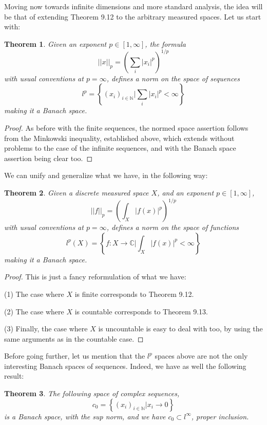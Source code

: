 \documentclass[12pt]{amsbook}
\newtheorem{theorem}{Theorem}[chapter]
\begin{document}
Moving now towards infinite dimensions and more standard analysis, the idea will be that of extending Theorem 9.12 to the arbitrary measured spaces. Let us start with:


\begin{theorem}
Given an exponent $p\in[1,\infty]$, the formula
$$||x||_p=\left(\sum_i|x_i|^p\right)^{1/p}$$
with usual conventions at $p=\infty$, defines a norm on the space of sequences
$$l^p=\left\{(x_i)_{i\in\mathbb N}\Big|\sum_i|x_i|^p<\infty\right\}$$
making it a Banach space.
\end{theorem}

\begin{proof}
As before with the finite sequences, the normed space assertion follows from the Minkowski inequality, established above, which extends without problems to the case of the infinite sequences, and with the Banach space assertion being clear too.
\end{proof}

We can unify and generalize what we have, in the following way:

\begin{theorem}
Given a discrete measured space $X$, and an exponent $p\in[1,\infty]$,
$$||f||_p=\left(\int_X|f(x)|^p\right)^{1/p}$$
with usual conventions at $p=\infty$, defines a norm on the space of functions 
$$l^p(X)=\left\{f:X\to\mathbb C\Big|\int_X|f(x)|^p<\infty\right\}$$
making it a Banach space.
\end{theorem}

\begin{proof}
This is just a fancy reformulation of what we have:

\medskip

(1) The case where $X$ is finite corresponds to Theorem 9.12.

\medskip

(2) The case where $X$ is countable corresponds to Theorem 9.13.

\medskip

(3) Finally, the case where $X$ is uncountable is easy to deal with too, by using the same arguments as in the countable case.
\end{proof}

Before going further, let us mention that the $l^p$ spaces above are not the only interesting Banach spaces of sequences. Indeed, we have as well the following result:

\begin{theorem}
The following space of complex sequences,
$$c_0=\left\{(x_i)_{i\in\mathbb N}\Big|x_i\to0\right\}$$
is a Banach space, with the sup norm, and we have $c_0\subset l^\infty$, proper inclusion.
\end{theorem}
\end{document}
